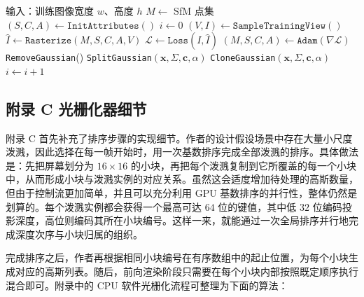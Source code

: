 \begin{algorithm}[H]
    \caption{优化与高斯致密化算法}
    \small
    \begin{algorithmic}[1]
        \STATE 输入：训练图像宽度 \(w\)、高度 \(h\)
        \STATE \(M \leftarrow \) SfM 点集
        \STATE \((S, C, A) \leftarrow \texttt{InitAttributes}()\)
        \STATE \(i \leftarrow 0\)
            \STATE \((V, I) \leftarrow \texttt{SampleTrainingView}()\)
            \STATE \(\hat{I} \leftarrow \texttt{Rasterize}(M, S, C, A, V)\)
            \STATE \(\mathcal{L} \leftarrow \texttt{Loss}(I, \hat{I})\)
            \STATE \((M, S, C, A) \leftarrow \texttt{Adam}(\nabla \mathcal{L})\)
                        \STATE \texttt{RemoveGaussian}()
                    \ENDIF
                            \STATE \texttt{SplitGaussian}\((\mathbf{x}, \Sigma, \mathbf{c}, \alpha)\)
                        \ELSE
                            \STATE \texttt{CloneGaussian}\((\mathbf{x}, \Sigma, \mathbf{c}, \alpha)\)
                        \ENDIF
                    \ENDIF
                \ENDFOR
            \ENDIF
            \STATE \(i \leftarrow i + 1\)
        \ENDWHILE
    \end{algorithmic}
\end{algorithm}

\subsection{附录 C 光栅化器细节}

附录 C 首先补充了排序步骤的实现细节。作者的设计假设场景中存在大量小尺度泼溅，因此选择在每一帧开始时，用一次基数排序完成全部泼溅的排序。具体做法是：先把屏幕划分为 \(16\times16\) 的小块，再把每个泼溅复制到它所覆盖的每一个小块中，从而形成小块与泼溅实例的对应关系。虽然这会适度增加待处理的高斯数量，但由于控制流更加简单，并且可以充分利用 GPU 基数排序的并行性，整体仍然是划算的。每个泼溅实例都会获得一个最高可达 \(64\) 位的键值，其中低 \(32\) 位编码投影深度，高位则编码其所在小块编号。这样一来，就能通过一次全局排序并行地完成深度次序与小块归属的组织。

完成排序之后，作者再根据相同小块编号在有序数组中的起止位置，为每个小块生成对应的高斯列表。随后，前向渲染阶段只需要在每个小块内部按照既定顺序执行混合即可。附录中的 CPU 软件光栅化流程可整理为下面的算法：


